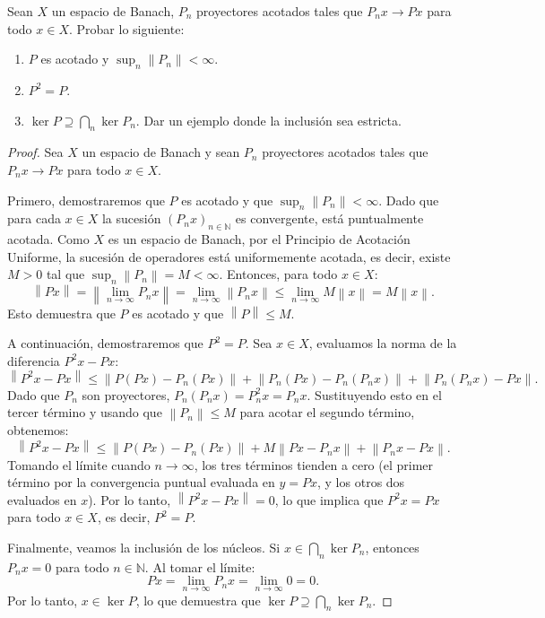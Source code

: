 \documentclass{article}
\theoremstyle{definition}
\newcommand{\N}{\mathbb{N}}
\newcommand{\norm}[1]{\left\lVert #1 \right\rVert}       %
\newenvironment{ejercicio}[1]{\begin{trivlist}
\item[\hskip \labelsep {\bfseries Ejercicio}\hskip \labelsep {\bfseries #1.}]}{\end{trivlist}}
\begin{document}
\vspace{0.5cm}

\begin{ejercicio}{5}
	Sean \( X \) un espacio de Banach, \( P_n \) proyectores acotados tales que \( P_n x \to Px \) para todo \( x \in X \). Probar lo siguiente:
	\begin{enumerate}
		\item \( P \) es acotado y \( \sup_n \norm{P_n} < \infty \).
		\item \( P^2 = P \).
		\item \( \ker P \supseteq \bigcap_n \ker P_n \). Dar un ejemplo donde la inclusión sea estricta.
	\end{enumerate}
\end{ejercicio}
\begin{proof}
	Sea \( X \) un espacio de Banach y sean \( P_n \) proyectores acotados tales que \( P_n x \to Px \) para todo \( x \in X \).

	Primero, demostraremos que \( P \) es acotado y que \( \sup_n \norm{P_n} < \infty \). Dado que para cada \( x \in X \) la sucesión \( {(P_n x)}_{n\in\N} \) es convergente, está puntualmente acotada. Como \( X \) es un espacio de Banach, por el Principio de Acotación Uniforme, la sucesión de operadores está uniformemente acotada, es decir, existe \( M > 0 \) tal que \( \sup_n \norm{P_n} = M < \infty \).
	Entonces, para todo \( x \in X \):
	\[
		\norm{Px} = \norm{\lim_{n \to \infty} P_n x} = \lim_{n \to \infty} \norm{P_n x} \le \lim_{n \to \infty} M \norm{x} = M \norm{x}.
	\]
	Esto demuestra que \( P \) es acotado y que \( \norm{P} \le M \).

	A continuación, demostraremos que \( P^2 = P \). Sea \( x \in X \), evaluamos la norma de la diferencia \( P^2 x - Px \):
	\[
		\norm{P^2 x - Px} \le \norm{P(Px) - P_n(Px)} + \norm{P_n(Px) - P_n(P_n x)} + \norm{P_n(P_n x) - Px}.
	\]
	Dado que \( P_n \) son proyectores, \( P_n(P_n x) = P_n^2 x = P_n x \). Sustituyendo esto en el tercer término y usando que \( \norm{P_n} \le M \) para acotar el segundo término, obtenemos:
	\[
		\norm{P^2 x - Px} \le \norm{P(Px) - P_n(Px)} + M \norm{Px - P_n x} + \norm{P_n x - Px}.
	\]
	Tomando el límite cuando \( n \to \infty \), los tres términos tienden a cero (el primer término por la convergencia puntual evaluada en \( y = Px \), y los otros dos evaluados en \( x \)). Por lo tanto, \( \norm{P^2 x - Px} = 0 \), lo que implica que \( P^2 x = Px \) para todo \( x \in X \), es decir, \( P^2 = P \).

	Finalmente, veamos la inclusión de los núcleos. Si \( x \in \bigcap_n \ker P_n \), entonces \( P_n x = 0 \) para todo \( n \in \mathbb{N} \). Al tomar el límite:
	\[
		Px = \lim_{n \to \infty} P_n x = \lim_{n \to \infty} 0 = 0.
	\]
	Por lo tanto, \( x \in \ker P \), lo que demuestra que \( \ker P \supseteq \bigcap_n \ker P_n \).


\end{proof}
\end{document}

